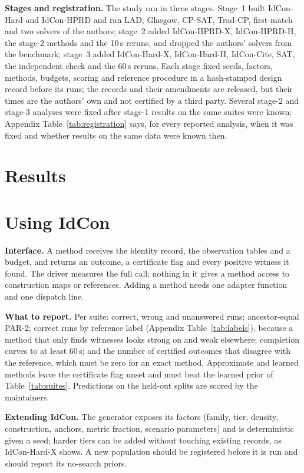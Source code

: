 \textbf{Stages and registration.} The study ran in three stages. Stage~1 built IdCon-Hard and IdCon-HPRD and ran LAD, Glasgow, CP-SAT, Trad-CP, first-match and two solvers of the authors; stage~2 added IdCon-HPRD-X, IdCon-HPRD-H, the stage-2 methods and the 10\,s reruns, and dropped the authors' solvers from the benchmark; stage~3 added IdCon-Hard-X, IdCon-Hard-H, IdCon-Cite, SAT, the independent check and the 60\,s reruns. Each stage fixed seeds, factors, methods, budgets, scoring and reference procedure in a hash-stamped design record before its runs; the records and their amendments are released, but their times are the authors' own and not certified by a third party. Several stage-2 and stage-3 analyses were fixed after stage-1 results on the same suites were known; Appendix Table~\ref{tab:registration} says, for every reported analysis, when it was fixed and whether results on the same data were known then.

\section{Results}
\label{sec:results}


\section{Using IdCon}
\textbf{Interface.} A method receives the identity record, the observation tables and a budget, and returns an outcome, a certificate flag and every positive witness it found. The driver measures the full call; nothing in it gives a method access to construction maps or references. Adding a method needs one adapter function and one dispatch line.

\textbf{What to report.} Per suite: correct, wrong and unanswered runs; ancestor-equal PAR-2; correct runs by reference label (Appendix Table~\ref{tab:labels}), because a method that only finds witnesses looks strong on \Unk{} and weak elsewhere; completion curves to at least 60\,s; and the number of certified outcomes that disagree with the reference, which must be zero for an exact method. Approximate and learned methods leave the certificate flag unset and must beat the learned prior of Table~\ref{tab:suites}. Predictions on the held-out splits are scored by the maintainers.

\textbf{Extending IdCon.} The generator exposes its factors (family, tier, density, construction, anchors, metric fraction, scenario parameters) and is deterministic given a seed; harder tiers can be added without touching existing records, as IdCon-Hard-X shows. A new population should be registered before it is run and should report its no-search priors.

